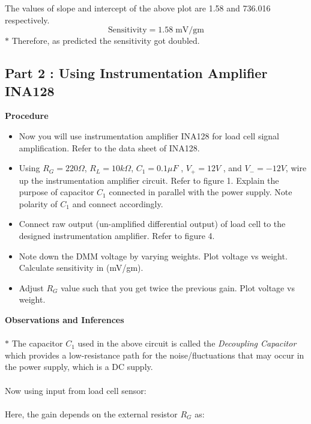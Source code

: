 \documentclass[12pt]{article}
\begin{document}
        \noindent
        The values of slope and intercept of the above plot are 1.58 and 736.016 respectively.
        \begin{equation}
            \boxed{\text{Sensitivity} = 1.58\; \text{mV/gm}} 
        \end{equation}
        \noindent
        $\ast$ Therefore, as predicted the sensitivity got doubled.\\
        
        
    \subsection{Part 2 : Using Instrumentation Amplifier INA128}
    
        \textbf{Procedure}
        \begin{itemize}
            \item Now you will use instrumentation amplifier INA128 for load cell signal
            amplification. Refer to the data sheet of INA128.
            \item Using $R_G = 220\Omega$, $R_L = 10k\Omega$, $C_1 = 0.1\mu F$ , $V_+ = 12V$ , and $V_- = -12V$, wire up the instrumentation amplifier circuit. Refer to figure 1.
            Explain the purpose of capacitor $C_1$ connected in parallel with the power
            supply. Note polarity of $C_1$ and connect accordingly.
            \item Connect raw output (un-amplified differential output) of load cell to the
            designed instrumentation amplifier. Refer to figure 4.
            \item Note down the DMM voltage by varying weights. Plot voltage vs weight.
            Calculate sensitivity in (mV/gm).
            \item Adjust $R_G$ value such that you get twice the previous gain. Plot voltage vs weight.
        \end{itemize}
        
        \noindent
        \textbf{Observations and Inferences}
        \\\\
        \noindent
        $\ast$ The capacitor $C_1$ used in the above circuit is called the \textit{Decoupling Capacitor} which provides a low-resistance path for the noise/fluctuations that may occur in the power supply, which is a DC supply.
        \\\\
        Now using input from load cell sensor:
        \\\\
        Here, the gain depends on the external resistor $R_G$ as:
        
\end{document}
